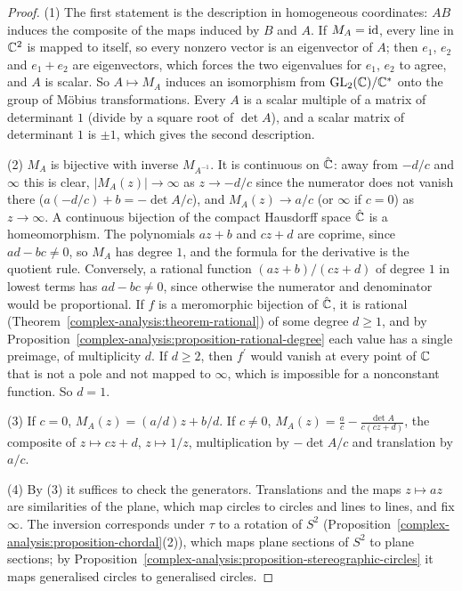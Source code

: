\begin{proof}
(1) The first statement is the description in homogeneous coordinates: $AB$ induces the composite of the maps induced by $B$ and $A$. If $M_A = \mathrm{id}$, every line in $\mathbb{C}^2$ is mapped to itself, so every
nonzero vector is an eigenvector of $A$; then $e_1$, $e_2$ and $e_1 + e_2$ are eigenvectors, which forces the two eigenvalues for $e_1$, $e_2$ to agree, and $A$ is scalar. So $A \mapsto M_A$ induces an isomorphism
from $\mathrm{GL}_2(\mathbb{C})/\mathbb{C}^*$ onto the group of M\"obius transformations. Every $A$ is a scalar multiple of a matrix of determinant $1$ (divide by a square root of $\det A$), and a scalar matrix of determinant $1$ is
$\pm1$, which gives the second description.

(2) $M_A$ is bijective with inverse $M_{A^{-1}}$. It is continuous on $\hat{\mathbb{C}}$: away from $-d/c$ and $\infty$ this is clear, $|M_A(z)| \to \infty$ as $z \to -d/c$ since the numerator does not vanish there
($a(-d/c) + b = -\det A/c$), and $M_A(z) \to a/c$ (or $\infty$ if $c = 0$) as $z \to \infty$. A continuous bijection of the compact Hausdorff space $\hat{\mathbb{C}}$ is a homeomorphism. The polynomials $az + b$ and $cz + d$
are coprime, since $ad - bc \neq 0$, so $M_A$ has degree $1$, and the formula for the derivative is the quotient rule. Conversely, a rational function $(az + b)/(cz + d)$ of degree $1$ in lowest terms has
$ad - bc \neq 0$, since otherwise the numerator and denominator would be proportional. If $f$ is a meromorphic bijection of $\hat{\mathbb{C}}$, it is rational (Theorem~\ref{complex-analysis:theorem-rational}) of some degree
$d \geq 1$, and by Proposition~\ref{complex-analysis:proposition-rational-degree} each value has a single preimage, of multiplicity $d$. If $d \geq 2$, then $f^{\prime}$ would vanish at every point of $\mathbb{C}$ that is not a pole and
not mapped to $\infty$, which is impossible for a nonconstant function. So $d = 1$.

(3) If $c = 0$, $M_A(z) = (a/d)z + b/d$. If $c \neq 0$, $M_A(z) = \frac ac - \frac{\det A}{c(cz + d)}$, the composite of $z \mapsto cz + d$, $z \mapsto 1/z$, multiplication by $-\det A/c$ and translation by $a/c$.

(4) By (3) it suffices to check the generators. Translations and the maps $z \mapsto az$ are similarities of the plane, which map circles to circles and lines to lines, and fix $\infty$. The inversion corresponds under
$\tau$ to a rotation of $S^2$ (Proposition~\ref{complex-analysis:proposition-chordal}(2)), which maps plane sections of $S^2$ to plane sections; by Proposition~\ref{complex-analysis:proposition-stereographic-circles}
it maps generalised circles to generalised circles.
\end{proof}

